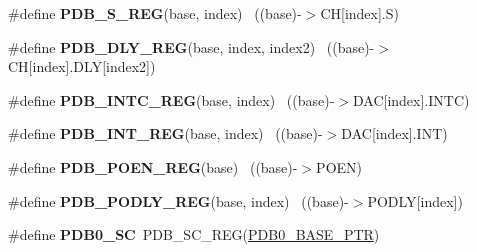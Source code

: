 \begin{DoxyCompactItemize}
\item 
\hypertarget{group___p_d_b___register___accessor___macros_gacae2553354248e45352a2dbee463e62d}{}\#define {\bfseries P\+D\+B\+\_\+\+S\+\_\+\+R\+E\+G}(base,  index)                                    ~((base)-\/$>$C\+H\mbox{[}index\mbox{]}.S)\label{group___p_d_b___register___accessor___macros_gacae2553354248e45352a2dbee463e62d}

\item 
\hypertarget{group___p_d_b___register___accessor___macros_ga2b72a7c3b1604a38397358fd0b271851}{}\#define {\bfseries P\+D\+B\+\_\+\+D\+L\+Y\+\_\+\+R\+E\+G}(base,  index,  index2)                  ~((base)-\/$>$C\+H\mbox{[}index\mbox{]}.D\+L\+Y\mbox{[}index2\mbox{]})\label{group___p_d_b___register___accessor___macros_ga2b72a7c3b1604a38397358fd0b271851}

\item 
\hypertarget{group___p_d_b___register___accessor___macros_ga872dcab8e3d15a466c56e2f7fb3d33e2}{}\#define {\bfseries P\+D\+B\+\_\+\+I\+N\+T\+C\+\_\+\+R\+E\+G}(base,  index)                              ~((base)-\/$>$D\+A\+C\mbox{[}index\mbox{]}.I\+N\+T\+C)\label{group___p_d_b___register___accessor___macros_ga872dcab8e3d15a466c56e2f7fb3d33e2}

\item 
\hypertarget{group___p_d_b___register___accessor___macros_ga7d45f442e722e2b7ba35b2bff6fafac9}{}\#define {\bfseries P\+D\+B\+\_\+\+I\+N\+T\+\_\+\+R\+E\+G}(base,  index)                                ~((base)-\/$>$D\+A\+C\mbox{[}index\mbox{]}.I\+N\+T)\label{group___p_d_b___register___accessor___macros_ga7d45f442e722e2b7ba35b2bff6fafac9}

\item 
\hypertarget{group___p_d_b___register___accessor___macros_gab3f4129b6c1d82cf04a4e0156ab6595a}{}\#define {\bfseries P\+D\+B\+\_\+\+P\+O\+E\+N\+\_\+\+R\+E\+G}(base)                                          ~((base)-\/$>$P\+O\+E\+N)\label{group___p_d_b___register___accessor___macros_gab3f4129b6c1d82cf04a4e0156ab6595a}

\item 
\hypertarget{group___p_d_b___register___accessor___macros_ga1dc2bd036463575232f4638acafa3efb}{}\#define {\bfseries P\+D\+B\+\_\+\+P\+O\+D\+L\+Y\+\_\+\+R\+E\+G}(base,  index)                            ~((base)-\/$>$P\+O\+D\+L\+Y\mbox{[}index\mbox{]})\label{group___p_d_b___register___accessor___macros_ga1dc2bd036463575232f4638acafa3efb}

\item 
\hypertarget{group___p_d_b___register___accessor___macros_ga033ea8777ba5d2f3491be5723fc6eea5}{}\#define {\bfseries P\+D\+B0\+\_\+\+S\+C}~P\+D\+B\+\_\+\+S\+C\+\_\+\+R\+E\+G(\hyperlink{group___p_d_b___peripheral_ga8e197b7c43fd7a0bf1a38caa1918b7b5}{P\+D\+B0\+\_\+\+B\+A\+S\+E\+\_\+\+P\+T\+R})\label{group___p_d_b___register___accessor___macros_ga033ea8777ba5d2f3491be5723fc6eea5}


\end{DoxyCompactItemize}
